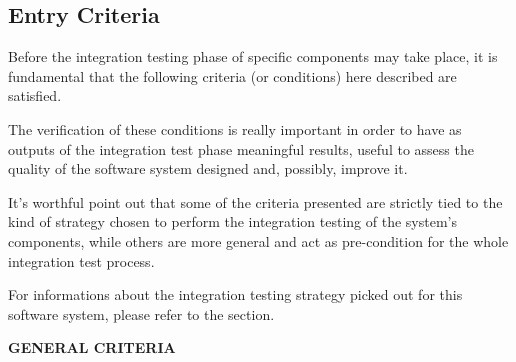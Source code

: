 \subsection{Entry Criteria}

Before the integration testing phase of specific components may take place, it is fundamental that the following criteria (or conditions) here described are satisfied.

The verification of these conditions is really important in order to have as outputs of the integration test phase meaningful results, useful to assess the quality of the software system designed and, possibly, improve it.

It's worthful point out that some of the criteria presented are strictly tied to the kind of strategy chosen to perform the integration testing of the system's components, while others are more general and act as pre-condition for the whole integration test process.

For informations about the integration testing strategy picked out for this software system, please refer to the \textit{} section.

\textbf{GENERAL CRITERIA}


